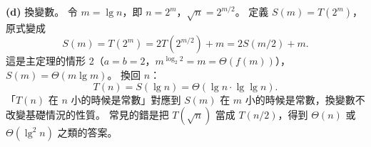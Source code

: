 \begin{pastsoln}
\textbf{(d)} 換變數。 令 $m = \lg n$，即 $n = 2^m$，$\sqrt{n} = 2^{m/2}$。 定義 $S(m) = T(2^m)$，
原式變成
\[
S(m) = T(2^m) = 2T(2^{m/2}) + m = 2S(m/2) + m .
\]
這是主定理的情形 2（$a = b = 2$，$m^{\log_2 2} = m = \Theta(f(m))$），$S(m) = \Theta(m \lg m)$。
換回 $n$：
\[
T(n) = S(\lg n) = \Theta(\lg n \cdot \lg\lg n).
\]
「$T(n)$ 在 $n$ 小的時候是常數」對應到 $S(m)$ 在 $m$ 小的時候是常數，換變數不改變基礎情況的性質。
常見的錯是把 $T(\sqrt{n})$ 當成 $T(n/2)$，得到 $\Theta(n)$ 或 $\Theta(\lg^2 n)$ 之類的答案。
\end{pastsoln}
